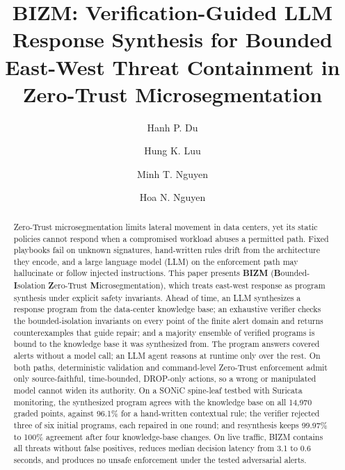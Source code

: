 \documentclass[final,5p]{elsarticle}
\begin{document}
\begin{frontmatter}

\title{BIZM: Verification-Guided LLM Response Synthesis for Bounded East-West Threat Containment in Zero-Trust Microsegmentation}

\author{Hanh P. Du}

\author{Hung K. Luu}

\author{Minh T. Nguyen}

\author{Hoa N. Nguyen}



\begin{abstract}
Zero-Trust microsegmentation limits lateral movement in data centers, yet its static policies cannot respond when a compromised workload abuses a permitted path. Fixed playbooks fail on unknown signatures, hand-written rules drift from the architecture they encode, and a large language model (LLM) on the enforcement path may hallucinate or follow injected instructions. This paper presents \textbf{BIZM} (\textbf{B}ounded-\textbf{I}solation \textbf{Z}ero-Trust \textbf{M}icrosegmentation), which treats east-west response as program synthesis under explicit safety invariants. Ahead of time, an LLM synthesizes a response program from the data-center knowledge base; an exhaustive verifier checks the bounded-isolation invariants on every point of the finite alert domain and returns counterexamples that guide repair; and a majority ensemble of verified programs is bound to the knowledge base it was synthesized from. The program answers covered alerts without a model call; an LLM agent reasons at runtime only over the rest. On both paths, deterministic validation and command-level Zero-Trust enforcement admit only source-faithful, time-bounded, DROP-only actions, so a wrong or manipulated model cannot widen its authority. On a SONiC spine-leaf testbed with Suricata monitoring, the synthesized program agrees with the knowledge base on all 14,970 graded points, against 96.1\% for a hand-written contextual rule; the verifier rejected three of six initial programs, each repaired in one round; and resynthesis keeps 99.97\% to 100\% agreement after four knowledge-base changes. On live traffic, BIZM contains all threats without false positives, reduces median decision latency from 3.1 to 0.6 seconds, and produces no unsafe enforcement under the tested adversarial alerts.
\end{abstract}


\end{frontmatter}
\end{document}
